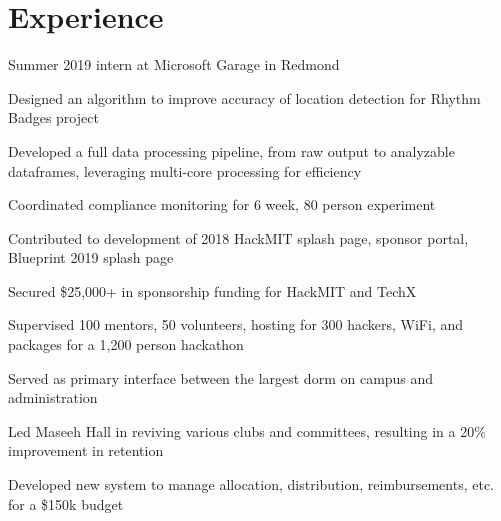 \documentclass[]{deedy-resume-openfont}
\begin{document}
\section{Experience}
\hfill {}
\begin{tightemize}
    \item Summer 2019 intern at Microsoft Garage in Redmond
\end{tightemize}
\sectionsep
{}\hfill {}
\begin{tightemize}
	\item Designed an algorithm to improve accuracy of location detection for Rhythm Badges project
	\item Developed a full data processing pipeline, from raw output to analyzable dataframes, leveraging multi-core processing for efficiency
	\item Coordinated compliance monitoring for 6 week, 80 person experiment
\end{tightemize}
\sectionsep
{}\hfill {}
\begin{tightemize}
	\item Contributed to development of 2018 HackMIT splash page, sponsor portal, Blueprint 2019 splash page
	\item Secured \$25,000+ in sponsorship funding for HackMIT and TechX
	\item Supervised 100 mentors, 50 volunteers, hosting for 300 hackers, WiFi, and packages for a 1,200 person hackathon
\end{tightemize}
\sectionsep
{}\hfill {}
\begin{tightemize}
    \item Served as primary interface between the largest dorm on campus and administration
    \item Led Maseeh Hall in reviving various clubs and committees, resulting in a 20\% improvement in retention
	\item Developed new system to manage allocation, distribution, reimbursements, etc. for a \$150k budget
\end{tightemize}
\sectionsep

\end{document}
